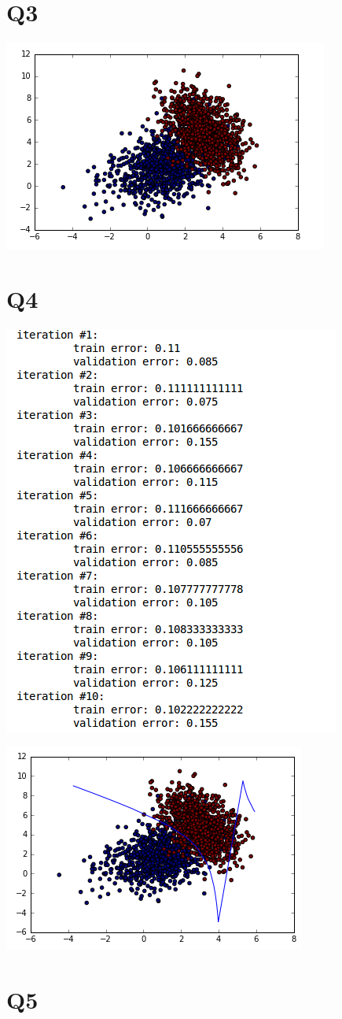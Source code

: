 \documentclass[11]{article}
\begin{document}
 \section*{Q3}

 \includegraphics[scale=1]{fig6.png}


 \section*{Q4}


 \includegraphics[scale=1]{fig7.png}
 
 \includegraphics[scale=1]{fig8.png}

 \section*{Q5}




 
\end{document}
